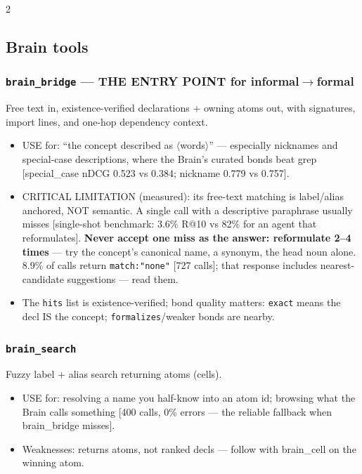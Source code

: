 \documentclass[10pt]{article}
\newcommand{\code}[1]{\texttt{#1}}
\begin{document}
{\begin{multicols}{2}
\subsection{Brain tools}

\subsubsection{\code{brain\_bridge} --- THE ENTRY POINT for
informal$\to$formal}
Free text in, existence-verified declarations + owning atoms out, with
signatures, import lines, and one-hop dependency context.
\begin{itemize}
\item USE for: ``the concept described as $\langle$words$\rangle$'' ---
  especially nicknames and special-case descriptions, where the Brain's
  curated bonds beat grep [special\_case nDCG 0.523 vs 0.384; nickname
  0.779 vs 0.757].
\item CRITICAL LIMITATION (measured): its free-text matching is
  label/alias anchored, NOT semantic. A single call with a descriptive
  paraphrase usually misses [single-shot benchmark: 3.6\% R@10 vs 82\% for
  an agent that reformulates]. \textbf{Never accept one miss as the answer:
  reformulate 2--4 times} --- try the concept's canonical name, a synonym,
  the head noun alone. 8.9\% of calls return \code{match:"none"} [727
  calls]; that response includes nearest-candidate suggestions --- read
  them.
\item The \code{hits} list is existence-verified; bond quality matters:
  \code{exact} means the decl IS the concept; \code{formalizes}/weaker
  bonds are nearby.
\end{itemize}

\subsubsection{\code{brain\_search}}
Fuzzy label + alias search returning atoms (cells).
\begin{itemize}
\item USE for: resolving a name you half-know into an atom id; browsing
  what the Brain calls something [400 calls, 0\% errors --- the reliable
  fallback when brain\_bridge misses].
\item Weaknesses: returns atoms, not ranked decls --- follow with
  brain\_cell on the winning atom.
\end{itemize}


\end{multicols}}
\end{document}
